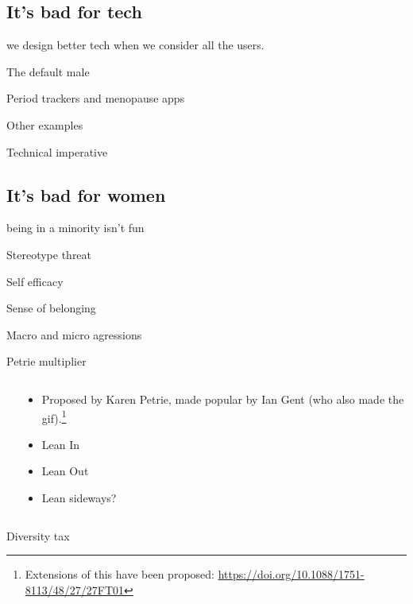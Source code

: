 \documentclass[xcolor=table]{beamer}
\begin{document}
\subsection{It's bad for tech}
\begin{frame}{we design better tech when we consider all the users. }

\end{frame}
\begin{frame}{The default male}
\end{frame}
\begin{frame}{Period trackers and menopause apps}
\end{frame}
\begin{frame}{Other examples}
\end{frame}
\begin{frame}{Technical imperative}
\end{frame}

\subsection{It's bad for women}
\begin{frame}{being in a minority isn't fun }

\end{frame}
\begin{frame}{Stereotype threat}
\end{frame}
\begin{frame}{Self efficacy}
\end{frame}
\begin{frame}{Sense of belonging }
\end{frame}
\begin{frame}{Macro and micro agressions}
\end{frame}
\begin{frame}{Petrie multiplier}
	\begin{columns}
		\begin{column}{0.5\textwidth}
		\end{column}
		\begin{column}{0.5\textwidth}
			\begin{itemize}
				\item Proposed by Karen Petrie, made popular by Ian Gent (who also made the gif).\footnote{Extensions of this have been proposed: \url{https://doi.org/10.1088/1751-8113/48/27/27FT01}}
					\pause
				\item Lean In
					\pause
				\item Lean Out
					\pause
				\item Lean sideways?
			\end{itemize}

		\end{column}
	\end{columns}
\end{frame}
\begin{frame}{Diversity tax}
\end{frame}
\end{document}
